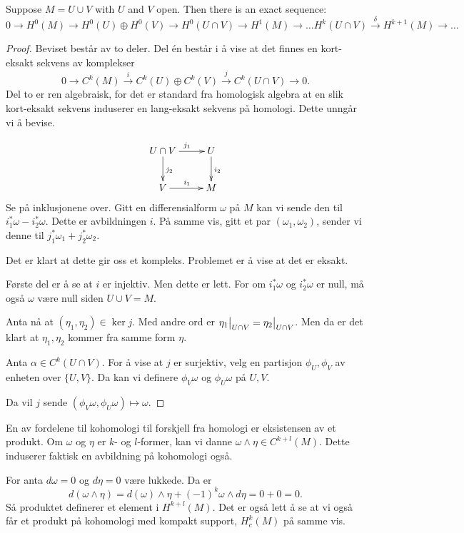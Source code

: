 \documentclass[11pt, english]{article}
\begin{document}
\begin{thm}
Suppose $M=U \cup V$ with $U$ and $V$ open. Then there is an exact sequence:
$$
0 \to H^0(M) \to H^0(U) \oplus H^0(V) \to H^0(U \cap V) \to H^1(M) \to \ldots H^k(U \cap V) \xrightarrow{\delta} H^{k+1}(M) \to \ldots
$$
\end{thm}
\begin{proof}
Beviset består av to deler. Del én består i å vise at det finnes en kort-eksakt sekvens av komplekser
$$
0 \to C^k(M) \xrightarrow{i} C^k(U) \oplus C^k(V) \xrightarrow j C^k(U \cap V) \to 0.
$$
Del to er ren algebraisk, for det er standard fra homologisk algebra at en slik kort-eksakt sekvens induserer en lang-eksakt sekvens på homologi. Dette unngår vi å bevise.

\[
\xymatrix{
U \cap V \ar[r]^{j_1} \ar[d]^{j_2} & U  \ar[d]^{i_2} \\
V \ar[r]^{i_1} & M
}
\]
Se på inklusjonene over. Gitt en differensialform $\omega$ på $M$ kan vi sende den til $i_1^\ast \omega - i_2^\ast \omega$. Dette er avbildningen $i$. På samme vis, gitt et par $(\omega_1, \omega_2)$, sender vi denne til $j_1^\ast \omega_1 + j_2^\ast \omega_2$.

Det er klart at dette gir oss et kompleks. Problemet er å vise at det er eksakt.

Første del er å se at $i$ er injektiv. Men dette er lett. For om $i_1^\ast \omega$ og $i_2^\ast \omega$ er null, må også $\omega$ være null siden $U \cup V=M$. 

Anta nå at $(\eta_1,\eta_2) \in \ker j$. Med andre ord er $\restr{\eta_1}{U \cap V} = \restr{\eta_2}{U \cap V}$. Men da er det klart at $\eta_1,\eta_2$ kommer fra samme form $\eta$.

Anta $\alpha \in C^k(U \cap V)$. For å vise at $j$ er surjektiv, velg en partisjon $\phi_U,\phi_V$ av enheten over $\{ U,V \}$. Da kan vi definere $\phi_V \omega$ og $\phi_U \omega$ på $U,V$. 

Da vil $j$ sende $(\phi_V \omega, \phi_U \omega) \mapsto \omega$.
\end{proof}



En av fordelene til kohomologi til forskjell fra homologi er eksistensen av et produkt. Om $\omega$ og $\eta$ er $k$- og $l$-former, kan vi danne $\omega \wedge \eta \in C^{k+l}(M)$. Dette induserer faktisk en avbildning på kohomologi også.

For anta $d\omega=0$ og $d \eta = 0$ være lukkede. Da er
$$
d(\omega \wedge \eta) = d(\omega) \wedge \eta + (-1)^k \omega \wedge d \eta = 0 + 0 = 0.
$$
Så produktet definerer et element i $H^{k+l}(M)$. Det er også lett å se at vi også får et produkt på kohomologi med kompakt support, $H_c^k(M)$ på samme vis.
\end{document}
